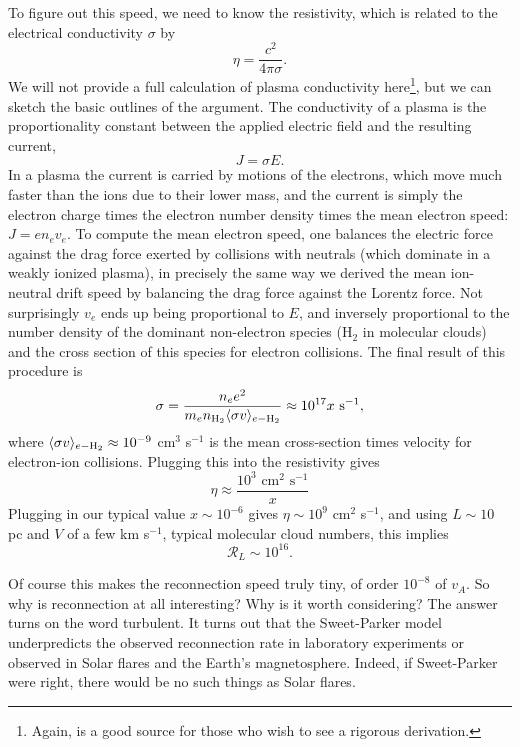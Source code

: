 To figure out this speed, we need to know the resistivity, which is related to the electrical conductivity $\sigma$ by
\begin{equation}
\eta = \frac{c^2}{4\pi \sigma}.
\end{equation}
We will not provide a full calculation of plasma conductivity here\footnote{Again, \citet{shu92a} is a good source for those who wish to see a rigorous derivation.}, but we can sketch the basic outlines of the argument. The conductivity of a plasma is the proportionality constant between the applied electric field and the resulting current,
\begin{equation}
J = \sigma E.
\end{equation}
In a plasma the current is carried by motions of the electrons, which move much faster than the ions due to their lower mass, and the current is simply the electron charge times the electron number density times the mean electron speed: $J = e n_e v_e$. To compute the mean electron speed, one balances the electric force against the drag force exerted by collisions with neutrals (which dominate in a weakly ionized plasma), in precisely the same way we derived the mean ion-neutral drift speed by balancing the drag force against the Lorentz force. Not surprisingly $v_e$ ends up being proportional to $E$, and inversely proportional to the number density of the dominant non-electron species (H$_2$ in molecular clouds) and the cross section of this species for electron collisions. The final result of this procedure is
\begin{equation}
\sigma = \frac{n_e e^2}{m_e n_{\rm H_2} \langle\sigma v\rangle_{e-\rm H_2}} \approx 10^{17} x\mbox{ s}^{-1},
\end{equation}
where $\langle\sigma v\rangle_{e-\rm H_2}\approx 10^{-9}$ cm$^3$ s$^{-1}$ is the mean cross-section times velocity for electron-ion collisions. Plugging this into the resistivity gives
\begin{equation}
\eta \approx \frac{10^3\mbox{ cm}^2\mbox{ s}^{-1}}{x}
\end{equation}
Plugging in our typical value $x\sim 10^{-6}$ gives $\eta\sim 10^{9}$ cm$^2$ s$^{-1}$, and using $L\sim 10$ pc and $V$ of a few km s$^{-1}$, typical molecular cloud numbers, this implies
\begin{equation}
\mathcal{R}_L \sim 10^{16}.
\end{equation}

Of course this makes the reconnection speed truly tiny, of order $10^{-8}$ of $v_A$. So why is reconnection at all interesting? Why is it worth considering? The answer turns on the word turbulent. It turns out that the Sweet-Parker model underpredicts the observed reconnection rate in laboratory experiments or observed in Solar flares and the Earth's magnetosphere. Indeed, if Sweet-Parker were right, there would be no such things as Solar flares.

